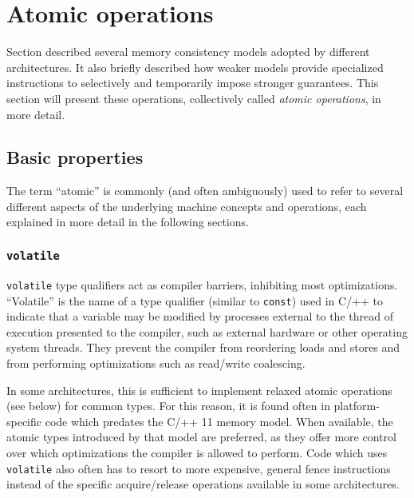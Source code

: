 \section{Atomic operations}

\label{sec:conc:atomic}

Section  described several memory consistency
models adopted by different architectures.  It also briefly described how weaker
models provide specialized instructions to selectively and temporarily impose
stronger guarantees.  This section will present these operations, collectively
called \textit{atomic operations}, in more detail.

\subsection{Basic properties}

\label{subsec:conc:atomic_prop}

The term ``atomic'' is commonly (and often ambiguously) used to refer to several
different aspects of the underlying machine concepts and operations, each
explained in more detail in the following sections.

\subsubsection{\texttt{volatile}}

\texttt{volatile} type qualifiers act as compiler barriers, inhibiting most
optimizations.  ``Volatile'' is the name of a type qualifier (similar to
\texttt{const}) used in C/++ to indicate that a variable may be modified by
processes external to the thread of execution presented to the compiler, such as
external hardware or other operating system threads\footnotemark.  They prevent
the compiler from reordering loads and stores and from performing optimizations
such as read/write coalescing.


In some architectures, this is sufficient to implement relaxed atomic operations
(see below) for common types\footnotemark.  For this reason, it is found often
in platform-specific code which predates the C/++ 11 memory model.  When
available, the atomic types introduced by that model are preferred, as they
offer more control over which optimizations the compiler is allowed to perform.
Code which uses \texttt{volatile} also often has to resort to more expensive,
general fence instructions instead of the specific acquire/release operations
available in some architectures.

